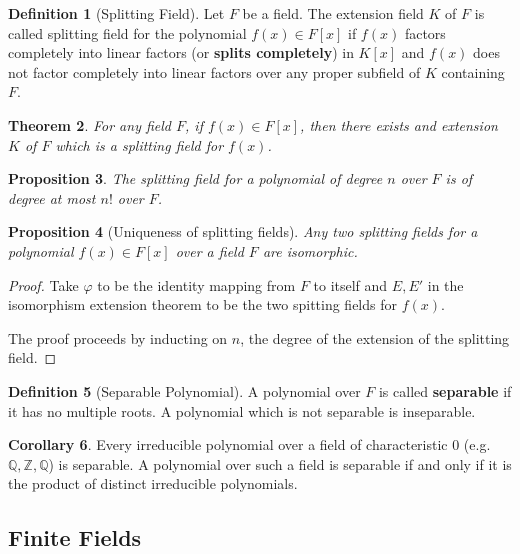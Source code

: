 \documentclass[10pt, oneside, reqno]{amsart}
\theoremstyle{plain}%
\newtheorem{thm}{Theorem}[section]
\newtheorem{prop}[thm]{Proposition}
\theoremstyle{definition}
\newtheorem{defn}[thm]{Definition}
\newtheorem{cor}[thm]{Corollary}
\theoremstyle{remark}
\newcommand{\Q}{\mathbb{Q}}
\newcommand{\R}{\mathbb{Q}}
\newcommand{\Z}{\mathbb{Z}}
\begin{document}
\begin{defn}[Splitting Field]
    Let $F$ be a field.  The extension field $K$ of $F$ is called splitting field for the polynomial $f(x) \in F[x]$ if $f(x)$ factors completely into linear factors (or \textbf{splits completely}) in $K[x]$ and $f(x)$ does not factor completely into linear factors over any proper subfield of $K$ containing $F$.
\end{defn}

\begin{thm}
    For any field $F$, if $f(x) \in F[x]$, then there exists and extension $K$ of $F$ which is a splitting field for $f(x)$.
\end{thm}

\begin{prop}
    The splitting field for a polynomial of degree $n$ over $F$ is of degree at most $n!$ over $F$.
\end{prop}


\begin{prop}[Uniqueness of splitting fields]
    Any two splitting fields for a polynomial $f(x) \in F[x]$ over a field $F$ are isomorphic.
\end{prop}

\begin{proof}
    Take $\varphi$ to be the identity mapping from $F$ to itself and $E, E'$ in the isomorphism extension theorem to be the two spitting fields for $f(x)$. 
    
    The proof proceeds by inducting on $n$, the degree of the extension of the splitting field.  
\end{proof}


\begin{defn}[Separable Polynomial]
    A polynomial over $F$ is called \textbf{separable} if it has no multiple roots.  A polynomial which is not separable is inseparable.
\end{defn}

\begin{cor}
    Every irreducible polynomial over a field of characteristic 0 (e.g. $\Q, \Z, \R$) is separable.  A polynomial over such a field is separable if and only if it is the product of distinct irreducible polynomials.
\end{cor}


\subsection{Finite Fields} %
\label{sub:finite_fields}
\end{document}
